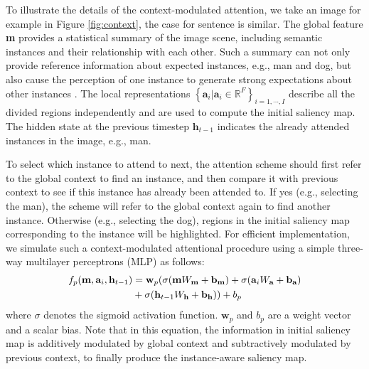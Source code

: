 \documentclass[10pt,twocolumn,letterpaper]{article}
\begin{document}
To illustrate the details of the context-modulated attention,
we take an image for example in Figure \ref{fig:context},
the case for sentence is similar.
The global feature \textbf{m} provides a statistical summary of the image scene,
including semantic instances and their relationship with each other.
Such a summary can not only provide reference information about
expected instances, e.g., man and dog,
but also cause the perception of one instance to generate
strong expectations about other instances \cite{chun1999top}.
The local representations $\left\{ {{{\textbf{a}}_i}}| {{\textbf{a}}_i} \in {\mathbb{R}^{F}}  \right\}_{i=1,\cdots,I}$
describe all the divided regions independently
and are used to compute the initial saliency map.
The hidden state at the previous timestep ${\textbf{h}_{t - 1}}$
indicates the already attended instances in the image, e.g., man.

To select which instance to attend to next,
the attention scheme should first refer to the global context to find an instance,
and then compare it with previous context to see if this instance has already been attended to.
If yes (e.g., selecting the man), the scheme will refer to the global context again to find another instance.
Otherwise (e.g., selecting the dog), regions in the initial saliency map corresponding to the instance will be highlighted.
For efficient implementation, we simulate such a context-modulated attentional procedure using
a simple three-way multilayer perceptrons (MLP)
as follows:
\begin{equation} \label{eqn:e2}
\begin{aligned}
{f_{{p}}}(\textbf{m}, {\textbf{a}_i}, {{\textbf{h}}_{t - 1}}) & =  {\kern 0pt} {\textbf{w}_p}(\sigma (\textbf{m}{W_\textbf{m}} + {\textbf{b}_\textbf{m}}) + \sigma ({\textbf{a}_i}{W_\textbf{a}} + {\textbf{b}_\textbf{a}}) \\
&+ \sigma ({\textbf{h}_{t - 1}}{W_\textbf{h}} + {\textbf{b}_\textbf{h}})) + {{b}_p}
\end{aligned}
\end{equation}
where $\sigma$ denotes the sigmoid activation function. ${\textbf{w}_p}$ and ${{b}_p}$ are a weight vector and a scalar bias.
Note that in this equation,
the information in initial saliency map is additively modulated by
global context and subtractively modulated by previous context,
to finally produce the instance-aware saliency map.
\end{document}
